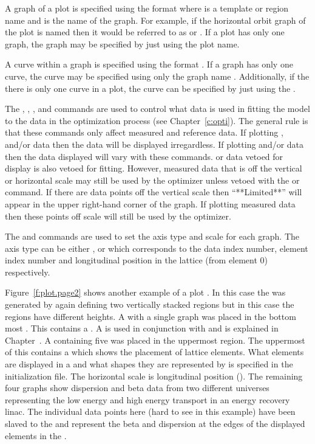 A graph of a plot is specified using the format
 where  is a template or region
name and  is the name of the graph. For example, if the
horizontal orbit graph of the  plot is named  then it
would be referred to as  or . If a plot has only
one graph, the graph may be specified by just using the plot name.

A curve within a graph is specified using the format
. If a graph has only one curve,
the curve may be specified using only the graph name
. Additionally, if the there is only one
curve in a plot, the curve can be specified by just using the
.

The , , , and  commands are used
to control what data is used in fitting the model to the data in the
optimization process (see Chapter~\ref{c:opti}). The general rule is
that these commands only affect measured and reference data. If
plotting ,  and/or  data then the data
will be displayed irregardless. If plotting  and/or  data
then the data displayed will vary with these commands.   or
 data vetoed for display is also vetoed for fitting.  However,
measured data that is off the vertical or horizontal scale may still be
used by the optimizer unless vetoed with the  or 
command.  If there are data points off the vertical scale then
``**Limited**'' will appear in the upper right-hand corner of the
graph. If plotting measured data then these points off scale will
still be used by the optimizer.

The  and  commands are used to set the axis
type and scale for each graph. The axis type can be either ,
 or  which corresponds to the data index number,
element index number and longitudinal position in the lattice (from
element 0) respectively.

Figure~\ref{f:plot.page2} shows another example of a plot .
In this case the  was generated by again defining two
vertically stacked regions but in this case the regions have different
heights.  A  with a single graph was placed in the
bottom most .  This  contains a .
A  is used in conjunction with  and is
explained in Chapter~. A  containing
five  was placed in the uppermost region. The uppermost
 of this  contains a  which
shows the placement of lattice elements.  What elements are displayed
in a  and what shapes they are represented by is
specified in the initialization file. The horizontal scale is
longitudinal position ().  The remaining four graphs show
dispersion and beta data from two different universes representing the
low energy and high energy transport in an energy recovery linac. The
individual data points here (hard to see in this example) have been
slaved to the  and represent the beta and dispersion at
the edges of the displayed elements in the .


